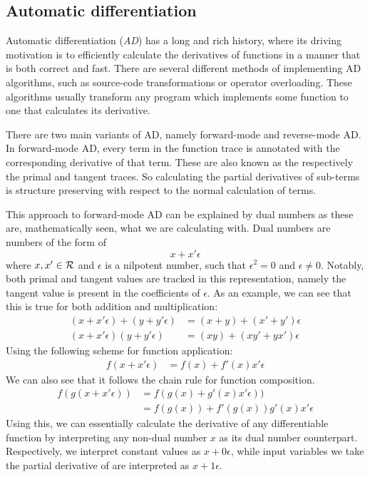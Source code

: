 \subsection{Automatic differentiation}
Automatic differentiation (\textit{AD}) has a long and rich history, where its driving motivation is to efficiently calculate the derivatives of functions in a manner that is both correct and fast\cite{Baydin2015AutomaticDI}.
There are several different methods of implementing AD algorithms, such as source-code transformations or operator overloading.
These algorithms usually transform any program which implements some function to one that calculates its derivative.

There are two main variants of AD, namely forward-mode and reverse-mode AD.
In forward-mode AD, every term in the function trace is annotated with the corresponding derivative of that term.
These are also known as the respectively the primal and tangent traces.
So calculating the partial derivatives of sub-terms is structure preserving with respect to the normal calculation of terms.

This approach to forward-mode AD can be explained by dual numbers as these are, mathematically seen, what we are calculating with\cite{Baydin2015AutomaticDI}. Dual numbers are numbers of the form of
$$
  x + x' \epsilon
$$
where $x, x' \in \mathcal{R}$ and $\epsilon$ is a nilpotent number, such that $\epsilon^2 = 0$ and $\epsilon \neq 0$.
Notably, both primal and tangent values are tracked in this representation, namely the tangent value is present in the coefficients of $\epsilon$.
As an example, we can see that this is true for both addition and multiplication:
\begin{align*}
  (x + x' \epsilon) + (y + y' \epsilon) &= (x + y) + (x' + y')\epsilon \\
  (x + x' \epsilon)(y + y' \epsilon) &= (xy) + (xy' + yx')\epsilon
\end{align*}
Using the following scheme for function application:
\begin{align*}
  f(x + x' \epsilon) &= f(x) + f'(x)x'\epsilon
\end{align*}
We can also see that it follows the chain rule for function composition.
\begin{align*}
  f(g(x + x' \epsilon)) &= f(g(x) + g'(x)x'\epsilon)) \\
    &= f(g(x)) + f'(g(x))g'(x)x'\epsilon
\end{align*}
Using this, we can essentially calculate the derivative of any differentiable function by interpreting any non-dual number $x$ as its dual number counterpart. Respectively, we interpret constant values as $x + 0\epsilon$, while input variables we take the partial derivative of are interpreted as $x + 1\epsilon$.

